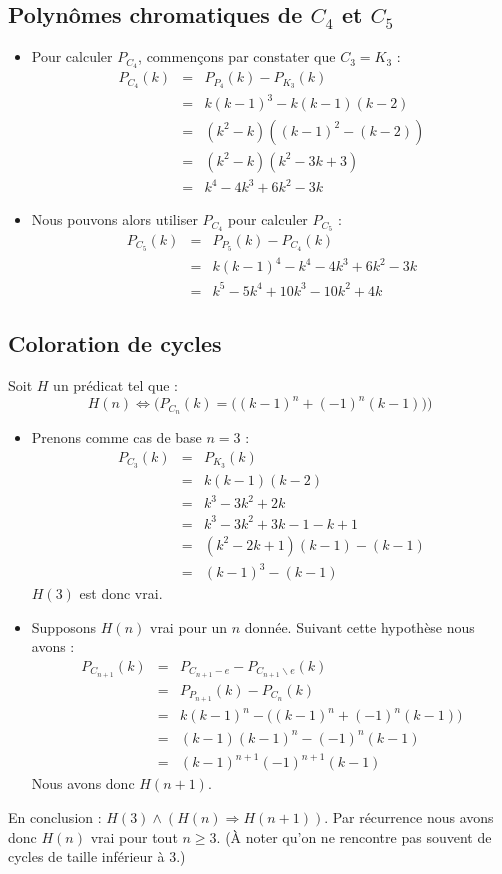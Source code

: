 \subsection{Polynômes chromatiques de $C_4$ et $C_5$}
\begin {itemize}
\item Pour calculer $P_{C_4}$, commençons par constater que $C_3 = K_3$ :
\begin{eqnarray*}
P_{C_4}(k)	& = &	P_{P_4}(k) - P_{K_3}(k)				\\
			& = & 	k(k-1)^3 - k(k-1)(k-2)				\\
			& = & 	(k^2 - k)((k-1)^2 - (k-2))			\\
			& = &	(k^2 - k)(k^2 - 3k + 3)				\\
			& = & 	k^4 - 4k^3 + 6k^2 - 3k							
\end{eqnarray*}
\item Nous pouvons alors utiliser $P_{C_4}$ pour calculer $P_{C_5}$ :
\begin{eqnarray*}
P_{C_5}(k)	& = &	P_{P_5}(k) - P_{C_4}(k)				\\
			& = & 	k(k-1)^4 - k^4 -4k^3 + 6k^2 - 3k	\\
			& = &	k^5 - 5k^4 + 10k^3 - 10k^2 + 4k		 
\end{eqnarray*}
\end {itemize}

\subsection{Coloration de cycles}
Soit $H$ un prédicat tel que : 
\[ H(n) \Leftrightarrow \Big(P_{C_n}(k) = \big((k-1)^n + (-1)^n(k-1)\big)\Big) \]
\begin{itemize}
\item Prenons comme cas de base $n = 3$ :
\begin{eqnarray*}
P_{C_3}(k) 				& = &	P_{K_3}(k)						\\ 
						& = &	k(k-1)(k-2)						\\
						& = &	k^3 - 3k^2 + 2k					\\
						& = &   k^3 - 3k^2 + 3k - 1 - k + 1 	\\
						& = &	(k^2 -2k + 1)(k-1) - (k-1)		\\
						& = &	(k-1)^3 -(k-1) 					
\end{eqnarray*} $H(3)$ est donc vrai.
\item Supposons $H(n)$ vrai pour un $n$ donnée. Suivant cette hypothèse nous avons :
\begin{eqnarray*}
P_{C_{n+1}}(k)			& = & P_{C_{n+1}-e} - P_{C_{n+1}\backslash{e}}(k)	\\
						& = & P_{P_{n+1}}(k) - P_{C_n}(k)					\\
						& = & k(k-1)^n - \Big((k-1)^n + (-1)^n(k-1)\Big)	\\
						& = & (k-1)(k-1)^n - (-1)^n(k-1)					\\
						& = & (k-1)^{n+1} (-1)^{n+1}(k-1)					
\end{eqnarray*}
Nous avons donc $H(n+1)$.
\end{itemize}
En conclusion : $H(3) \wedge (H(n) \Rightarrow H(n+1))$. Par récurrence nous avons donc $H(n)$ vrai pour tout $n \geq 3$. 
(À noter qu'on ne rencontre pas souvent de cycles de taille inférieur à 3.)

